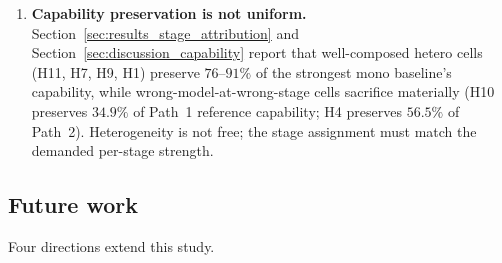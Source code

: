 \begin{enumerate}
  \item \textbf{Capability preservation is not uniform.} Section~\ref{sec:results_stage_attribution} and Section~\ref{sec:discussion_capability} report that well-composed hetero cells (H11, H7, H9, H1) preserve $76$--$91\%$ of the strongest mono baseline's capability, while wrong-model-at-wrong-stage cells sacrifice materially (H10 preserves $34.9\%$ of Path~1 reference capability; H4 preserves $56.5\%$ of Path~2). Heterogeneity is not free; the stage assignment must match the demanded per-stage strength.
\end{enumerate}

\subsection{Future work}

Four directions extend this study.

